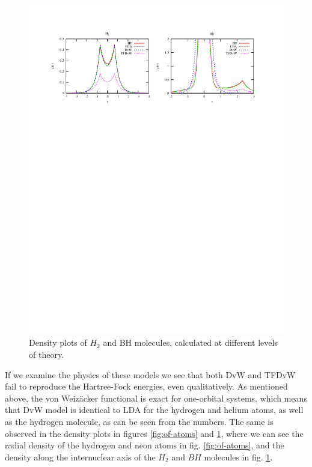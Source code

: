 \begin{figure}
    \centering
    \includegraphics[scale=0.7, viewport = 50 560 550 755]{figures/of_molecules.pdf}
    \caption{\footnotesize{Density plots of $H_2$ and BH molecules, calculated at different
	levels of theory.}}
    \label{fig:of-molecules}
\end{figure}

If we examine the physics of these models we see that both DvW and TFDvW fail to reproduce the Hartree-Fock energies,
even qualitatively. As mentioned above, the von Weiz\"{a}cker functional is exact for one-orbital systems, which means
that DvW model is identical to LDA for the hydrogen and helium atoms, as well as the hydrogen molecule, as can be seen 
from the numbers. The same is observed in the density plots in figures \ref{fig:of-atoms} and \ref{fig:of-molecules},
where we can see the radial density of the hydrogen and neon atoms in fig. \ref{fig:of-atoms}, and the density along
the internuclear axis of the $H_2$ and $BH$ molecules in fig. \ref{fig:of-molecules}. 

